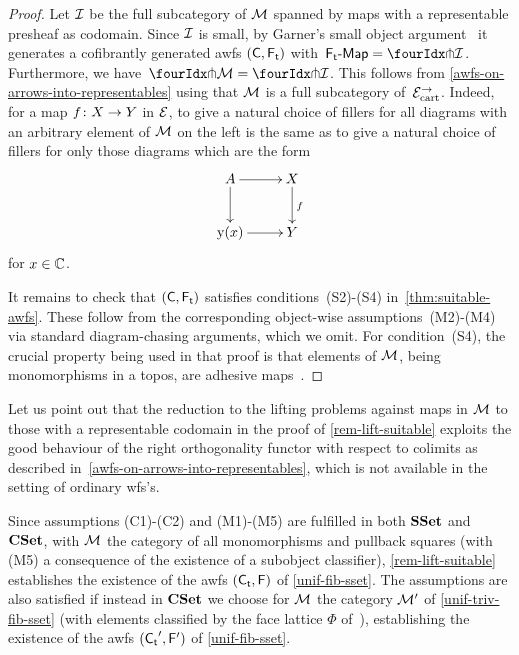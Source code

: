 \documentclass[reqno,10pt,a4paper,oneside,draft]{amsart}
\begin{document}
{{\begin{proof}
Let $\cal{I}$ be the full subcategory of $\cal{M}$ spanned by maps with a representable presheaf as codomain.
Since $\cal{I}$ is small, by Garner's small object argument~\cite{garner:small-object-argument} it generates a cofibrantly generated awfs $(\CC, \TF)$ with~$\pAlg{\TF} = \liftr{\cal{I}}$.
Furthermore, we have~$\liftr{\cal{M}} = \liftr{\cal{I}}$.
This follows from \cref{awfs-on-arrows-into-representables} using that $\cal{M}$ is a full subcategory of~$\cal{E}^\to_\cart$.
Indeed, for a map $f \co X \to Y$ in $\catE$, to give a natural choice of fillers for all diagrams with an arbitrary element of $\cal{M}$ on the left is the same as to give a natural choice of fillers for only those diagrams which are the form
\[
\xymatrix{
  A
  \ar[r]
  \ar[d]
&
  X
  \ar[d]^f
\\
  \yon(x)
  \ar[r]
&
  Y
}
\]
for $x \in \catC$.

It remains to check that $(\CC, \TF)$ satisfies conditions~(S2)-(S4) in~\cref{thm:suitable-awfs}.
These follow from the corresponding object-wise assumptions~(M2)-(M4) via standard diagram-chasing arguments, which we omit.
For condition~(S4), the crucial property being used in that proof is that elements of $\cal{M}$, being monomorphisms in a topos, are adhesive maps~\cite{garner-lack:adhesive}.
\end{proof}

\begin{remark}
\label{rem:colimit-decomp}
Let us point out that the reduction to the lifting problems against maps in $\cal{M}$ to those with a representable codomain in the proof of \cref{rem-lift-suitable} exploits the good behaviour of the right orthogonality functor with respect to colimits as described in~\cref{awfs-on-arrows-into-representables}, which is not available in the setting of ordinary wfs's.
\end{remark}

\begin{example} \label{justify-sset-cset-examples}
Since assumptions (C1)-(C2) and (M1)-(M5) are fulfilled in both $\SSet$ and~$\CSet$, with $\cal{M}$ the category of all monomorphisms and pullback squares (with (M5) a consequence of the existence of a subobject classifier), \cref{rem-lift-suitable} establishes the existence of the awfs $(\TC, \FF)$ of \cref{unif-fib-sset}.
The assumptions are also satisfied if instead in $\CSet$ we choose for $\cal{M}$ the category $\cal{M}'$ of \cref{unif-triv-fib-sset} (with elements classified by the face lattice $\Phi$ of~\cite{cohen-et-al:cubicaltt}), establishing the existence of the awfs $(\TC', \FF')$ of \cref{unif-fib-sset}.
\end{example}

}}
\end{document}
